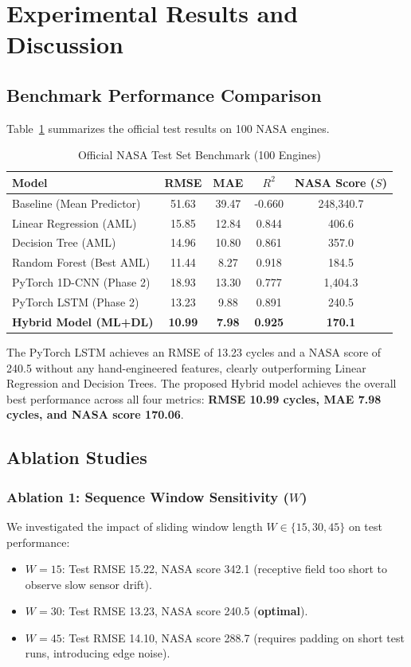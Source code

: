 \documentclass[conference]{IEEEtran}
\begin{document}
\section{Experimental Results and Discussion}

\subsection{Benchmark Performance Comparison}
Table~\ref{tab:results} summarizes the official test results on 100 NASA engines.

\begin{table}[htbp]
\caption{Official NASA Test Set Benchmark (100 Engines)}
\label{tab:results}
\centering
\begin{tabular}{lcccc}
\toprule
\textbf{Model} & \textbf{RMSE} & \textbf{MAE} & \textbf{$R^2$} & \textbf{NASA Score ($S$)} \\
\midrule
Baseline (Mean Predictor) & 51.63 & 39.47 & -0.660 & 248,340.7 \\
Linear Regression (AML) & 15.85 & 12.84 & 0.844 & 406.6 \\
Decision Tree (AML) & 14.96 & 10.80 & 0.861 & 357.0 \\
Random Forest (Best AML) & 11.44 & 8.27 & 0.918 & 184.5 \\
PyTorch 1D-CNN (Phase 2) & 18.93 & 13.30 & 0.777 & 1,404.3 \\
PyTorch LSTM (Phase 2) & 13.23 & 9.88 & 0.891 & 240.5 \\
\textbf{Hybrid Model (ML+DL)} & \textbf{10.99} & \textbf{7.98} & \textbf{0.925} & \textbf{170.1} \\
\bottomrule
\end{tabular}
\end{table}

The PyTorch LSTM achieves an RMSE of 13.23 cycles and a NASA score of 240.5 without any hand-engineered features, clearly outperforming Linear Regression and Decision Trees. The proposed Hybrid model achieves the overall best performance across all four metrics: \textbf{RMSE 10.99 cycles, MAE 7.98 cycles, and NASA score 170.06}.

\subsection{Ablation Studies}

\subsubsection{Ablation 1: Sequence Window Sensitivity ($W$)}
We investigated the impact of sliding window length $W \in \{15, 30, 45\}$ on test performance:
\begin{itemize}
    \item $W=15$: Test RMSE 15.22, NASA score 342.1 (receptive field too short to observe slow sensor drift).
    \item $W=30$: Test RMSE 13.23, NASA score 240.5 (\textbf{optimal}).
    \item $W=45$: Test RMSE 14.10, NASA score 288.7 (requires padding on short test runs, introducing edge noise).
\end{itemize}
\end{document}
